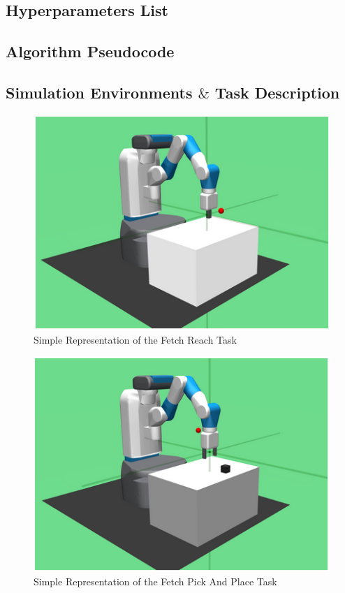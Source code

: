 \subsection{Hyperparameters List}

\subsection{Algorithm Pseudocode}

\subsection{Simulation Environments $\&$ Task Description}

\begin{figure}[h!]
    \centering
    \includegraphics{images/FR.png}
    \caption{Simple Representation of the Fetch Reach Task}
    \label{fig:FR}
\end{figure}

\begin{figure}[h!]
    \centering
    \includegraphics{images/FPAP.png}
    \caption{Simple Representation of the Fetch Pick And Place Task}
    \label{fig:FPAP}
\end{figure}

